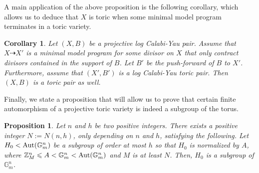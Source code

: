\documentclass{amsart}
\newcommand{\zz}{\mathbb{Z}}
\newtheorem{proposition}[theorem]{Proposition}
\newtheorem{corollary}[theorem]{Corollary}
\theoremstyle{remark}
\numberwithin{equation}{section}
\begin{document}
A main application of the above proposition is the following corollary, which allows us to deduce that $X$ is toric when some minimal model program terminates in a toric variety.

\begin{corollary}\label{cor:mmp-ending-toric}
Let $(X,B)$ be a projective log Calabi-Yau pair.
Assume that $X\dashrightarrow X'$ is a minimal model program for some divisor on $X$ that only contract divisors contained in the support of $B$.
Let $B'$ be the push-forward of $B$ to $X'$.
Furthermore, assume that $(X',B')$ is a log Calabi-Yau toric pair.
Then $(X,B)$ is a toric pair as well.
\end{corollary} 

Finally, we state a proposition that will allow us to prove that certain finite automorphism of a projective toric variety is indeed a subgroup of the torus.

\begin{proposition}\label{prop:making-H0-toric}
Let $n$ and $h$ be two positive integers.
There exists a positive integer $N:=N(n,h)$, only depending on $n$ and $h$, satisfying the following.
Let $H_0<{\rm Aut}(\mathbb{G}_m^n)$ be a subgroup of order at most $h$ so that $H_0$ is normalized by $A$, where
$\zz_M^n \leqslant A < \mathbb{G}_m^n < {\rm Aut}(\mathbb{G}_m^n)$
and $M$ is at least $N$.
Then, $H_0$ is a subgroup of $\mathbb{G}_m^n$.
\end{proposition}
\end{document}
